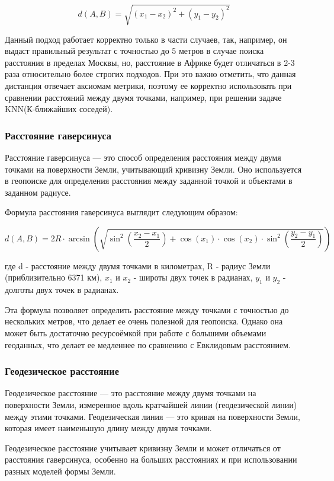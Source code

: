 $$
d(A, B)=\sqrt{(x_1-x_2)^2+(y_1-y_2)^2}
$$

Данный подход работает корректно только в части случаев, так, например, он выдаст правильный результат с точностью до 5 метров в случае поиска расстояния в пределах Москвы, но, расстояние в Африке будет отличаться в 2-3 раза относительно более строгих подходов.
При это важно отметить, что данная дистанция отвечает аксиомам метрики, поэтому ее корректно использовать при сравнении расстояний между двумя точками, например, при решении задаче KNN(К-ближайших соседей).

\subsubsection{Расстояние гаверсинуса}
Расстояние гаверсинуса — это способ определения расстояния между двумя точками на поверхности Земли, учитывающий кривизну Земли. Оно используется в геопоиске для определения расстояния между заданной точкой и объектами в заданном радиусе.

Формула расстояния гаверсинуса выглядит следующим образом:

$$
d(A, B) = 2R \cdot \arcsin\left(\sqrt{\sin^2\left(\frac{x_2-x_1}{2}\right) + \cos(x_1) \cdot \cos(x_2) \cdot \sin^2\left(\frac{y_2-y_1}{2}\right)}\right)
$$

где d - расстояние между двумя точками в километрах, R - радиус Земли (приблизительно 6371 км), $x_1$ и $x_2$ - широты двух точек в радианах, $y_1$ и $y_2$ - долготы двух точек в радианах.

Эта формула позволяет определить расстояние между точками с точностью до нескольких метров, что делает ее очень полезной для геопоиска. Однако она может быть достаточно ресурсоёмкой при работе с большими объемами геоданных, что делает ее медленнее по сравнению с Евклидовым расстоянием.

\subsubsection{Геодезическое расстояние}
Геодезическое расстояние — это расстояние между двумя точками на поверхности Земли, измеренное вдоль кратчайшей линии (геодезической линии) между этими точками. Геодезическая линия — это кривая на поверхности Земли, которая имеет наименьшую длину между двумя точками.

Геодезическое расстояние учитывает кривизну Земли и может отличаться от расстояния гаверсинуса, особенно на больших расстояниях и при использовании разных моделей формы Земли.

